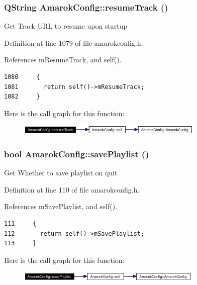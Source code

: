 \subsubsection{\setlength{\rightskip}{0pt plus 5cm}QString Amarok\-Config::resume\-Track ()\hspace{0.3cm}{\tt  [inline, static]}}\label{classAmarokConfig_AmarokConfige112}


Get Track URL to resume upon startup 

Definition at line 1079 of file amarokconfig.h.

References m\-Resume\-Track, and self().



\footnotesize\begin{verbatim}1080     {
1081       return self()->mResumeTrack;
1082     }
\end{verbatim}\normalsize 


Here is the call graph for this function:\begin{figure}[H]
\begin{center}
\leavevmode
\includegraphics[width=252pt]{classAmarokConfig_AmarokConfige112_cgraph}
\end{center}
\end{figure}
\subsubsection{\setlength{\rightskip}{0pt plus 5cm}bool Amarok\-Config::save\-Playlist ()\hspace{0.3cm}{\tt  [inline, static]}}\label{classAmarokConfig_AmarokConfige10}


Get Whether to save playlist on quit 

Definition at line 110 of file amarokconfig.h.

References m\-Save\-Playlist, and self().



\footnotesize\begin{verbatim}111     {
112       return self()->mSavePlaylist;
113     }
\end{verbatim}\normalsize 


Here is the call graph for this function:\begin{figure}[H]
\begin{center}
\leavevmode
\includegraphics[width=250pt]{classAmarokConfig_AmarokConfige10_cgraph}
\end{center}
\end{figure}
